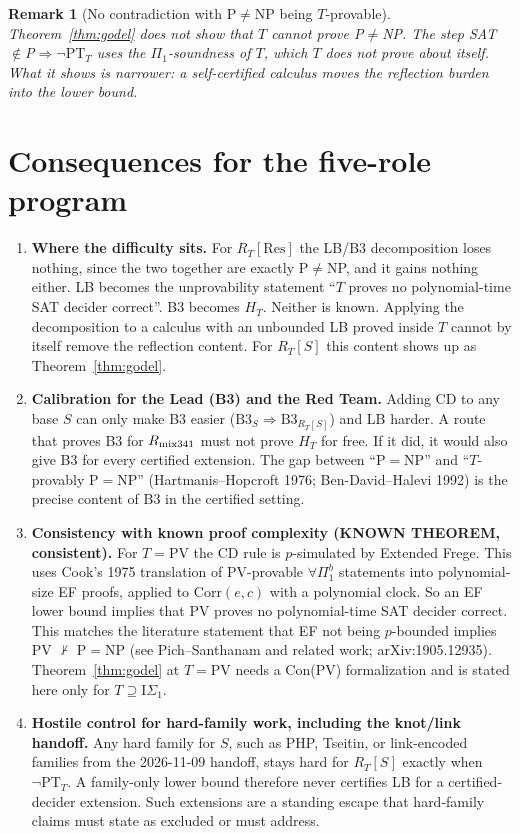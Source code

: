 \documentclass[11pt]{article}
\newtheorem{remark}{Remark}
\newcommand{\Corr}{\mathrm{Corr}}
\newcommand{\PT}{\mathrm{PT}}
\begin{document}
\begin{remark}[No contradiction with P$\neq$NP being $T$-provable]
Theorem~\ref{thm:godel} does \emph{not} show that $T$ cannot prove P$\neq$NP. The step
SAT$\notin$P$\Rightarrow\neg\PT_T$ uses the $\Pi_1$-soundness of $T$, which $T$ does not
prove about itself. What it shows is narrower: a self-certified calculus moves the
reflection burden into the lower bound.
\end{remark}

\section{Consequences for the five-role program}
\begin{enumerate}
\item \textbf{Where the difficulty sits.} For $R_T[\mathrm{Res}]$ the LB/B3 decomposition
loses nothing, since the two together are exactly P$\neq$NP, and it gains nothing either.
LB becomes the unprovability statement ``$T$ proves no polynomial-time SAT decider correct''.
B3 becomes $H_T$. Neither is known. Applying the decomposition to a calculus with an
unbounded LB proved inside $T$ cannot by itself remove the reflection content. For
$R_T[S]$ this content shows up as Theorem~\ref{thm:godel}.

\item \textbf{Calibration for the Lead (B3) and the Red Team.} Adding CD to any base $S$ can
only make B3 easier ($\mathrm{B3}_S\Rightarrow\mathrm{B3}_{R_T[S]}$) and LB harder. A route
that proves B3 for $R_{\rm mix341}$ must not prove $H_T$ for free. If it did, it would
also give B3 for every certified extension. The gap between ``P$=$NP'' and ``$T$-provably
P$=$NP'' (Hartmanis--Hopcroft 1976; Ben-David--Halevi 1992) is the precise content of B3
in the certified setting.

\item \textbf{Consistency with known proof complexity (KNOWN THEOREM, consistent).} For
$T=\mathrm{PV}$ the CD rule is $p$-simulated by Extended Frege. This uses Cook's 1975
translation of PV-provable $\forall\Pi^b_1$ statements into polynomial-size EF proofs,
applied to $\Corr(e,c)$ with a polynomial clock. So an EF lower bound implies that PV
proves no polynomial-time SAT decider correct. This matches the literature statement that
EF not being $p$-bounded implies PV $\nvdash$ P$=$NP (see Pich--Santhanam and related work;
arXiv:1905.12935). Theorem~\ref{thm:godel} at $T=\mathrm{PV}$ needs a Con(PV) formalization
and is stated here only for $T\supseteq\mathrm I\Sigma_1$.

\item \textbf{Hostile control for hard-family work, including the knot/link handoff.} Any
hard family for $S$, such as PHP, Tseitin, or link-encoded families from the 2026-11-09
handoff, stays hard for $R_T[S]$ exactly when $\neg\PT_T$. A family-only lower bound
therefore never certifies LB for a certified-decider extension. Such extensions are a
standing escape that hard-family claims must state as excluded or must address.
\end{enumerate}
\end{document}
